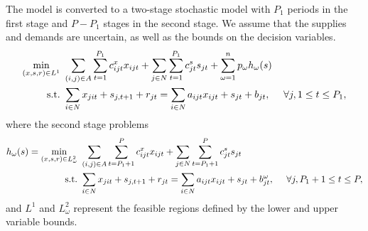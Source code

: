 \documentclass[opre,nonblindrev]{informs3} %
\newcommand{\x}{\mathbf{x}}
\newcommand{\y}{\mathbf{y}}
\renewcommand{\c}{\mathbf{c}}
\renewcommand{\b}{\mathbf{b}}
\renewcommand{\k}{\mathbf{k}}
\renewcommand{\d}{\mathbf{d}}
\newcommand{\st}{\mbox{s.t.}}
\newcommand{\plp}{$\phi$LP-2}
\begin{document}
The model is converted to a two-stage stochastic model with $P_1$ periods in the first stage and $P-P_1$ stages in the second stage.
We assume that the supplies and demands are uncertain, as well as the bounds on the decision variables.
\begin{align}
	\min_{(x,s,r) \in L^1} \ & \sum_{(i,j) \in A} \sum_{t=1}^{P_1} c_{ijt}^x x_{ijt} + \sum_{j \in N} \sum_{t=1}^{P_1} c_{jt}^s s_{jt} + \sum_{\omega=1}^n p_\omega h_\omega(s) \label{eq:gen_network_two_stage} \\
	\st \ & \sum_{i \in N} x_{jit} + s_{j,t+1} + r_{jt} = \sum_{i \in N} a_{ijt} x_{ijt} + s_{jt} + b_{jt},\ \ \ \ \forall j, 1 \leq t \leq P_1, \notag
\end{align}
where the second stage problems
\begin{align}
	h_\omega(s) = \min_{(x,s,r) \in L^2_\omega} \ & \sum_{(i,j) \in A} \sum_{t=P_1+1}^{P} c_{ijt}^x x_{ijt} + \sum_{j \in N} \sum_{t=P_1+1}^{P} c_{jt}^s s_{jt} \label{eq:gen_network_second_stage} \\
	\st \ & \sum_{i \in N} x_{jit} + s_{j,t+1} + r_{jt} = \sum_{i \in N} a_{ijt} x_{ijt} + s_{jt} + b_{jt}^\omega, \ \ \ \ \forall j, P_1+1 \leq t \leq P, \notag
\end{align}
and $L^1$ and $L^2_\omega$ represent the feasible regions defined by the lower and upper variable bounds.


\end{document}
